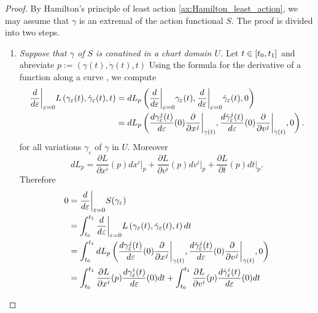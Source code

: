 \begin{proof}
	By Hamilton's principle of least action \ref{ax:Hamilton_least_action}, we may assume that $\gamma$ is an extremal of the action functional $S$. The proof is divided into two steps.
	\begin{enumerate}[label = \textit{Step \arabic*:},wide=0pt]
		\item \textit{Suppose that $\gamma$ of $S$ is conatined in a chart domain $U$.} Let $t \in \intcc[0]{t_0,t_1}$ and abreviate $p := (\gamma(t),\dot{\gamma}(t),t)$ Using the formula for the derivative of a function along a curve \cite[283]{lee:smooth_manifolds:2013}, we compute
			\begin{align*}
				\frac{d}{d\varepsilon}\bigg\vert_{\varepsilon = 0} L\del[0]{\gamma_\varepsilon(t),\dot{\gamma}_\varepsilon(t),t} &= dL_p\del[3]{\frac{d}{d\varepsilon}\bigg\vert_{\varepsilon = 0}\gamma_\varepsilon(t),\frac{d}{d\varepsilon}\bigg\vert_{\varepsilon = 0}\dot{\gamma}_\varepsilon(t),0}\\
				&= dL_p\del[3]{\frac{d\gamma_\varepsilon^j(t)}{d\varepsilon}(0)\frac{\partial}{\partial x^j}\bigg\vert_{\gamma(t)},\frac{d\dot{\gamma}_\varepsilon^j(t)}{d\varepsilon}(0)\frac{\partial}{\partial v^j}\bigg\vert_{\dot{\gamma}(t)},0}.
			\end{align*}
			\noindent for all variations $\gamma_\varepsilon$ of $\gamma$ in $U$. Moreover
			\begin{equation*}
				dL_p = \frac{\partial L}{\partial x^i}(p) dx^i\vert_p + \frac{\partial L}{\partial v^i}(p) dv^i\vert_p + \frac{\partial L}{\partial t}(p)dt\vert_p.
			\end{equation*}
			Therefore
			\begin{align*}
				0 &= \frac{d}{d\varepsilon}\bigg\vert_{\varepsilon = 0} S(\gamma_\varepsilon)\\
				&= \int_{t_0}^{t_1} \frac{d}{d\varepsilon}\bigg\vert_{\varepsilon = 0} L\del[0]{\gamma_\varepsilon(t),\dot{\gamma}_\varepsilon(t),t} dt\\
				&= \int_{t_0}^{t_1} dL_p\del[3]{\frac{d\gamma_\varepsilon^j(t)}{d\varepsilon}(0)\frac{\partial}{\partial x^j}\bigg\vert_{\gamma(t)},\frac{d\dot{\gamma}_\varepsilon^j(t)}{d\varepsilon}(0)\frac{\partial}{\partial v^j}\bigg\vert_{\dot{\gamma}(t)},0}\\
				&= \int_{t_0}^{t_1} \frac{\partial L}{\partial x^i}(p)\frac{d\gamma_\varepsilon^i(t)}{d\varepsilon}(0)dt + \int_{t_0}^{t_1}\frac{\partial L}{\partial v^i}(p)\frac{d\dot{\gamma}_\varepsilon^i(t)}{d\varepsilon}(0)dt\\

\end{align*}
\end{enumerate}
\end{proof}
